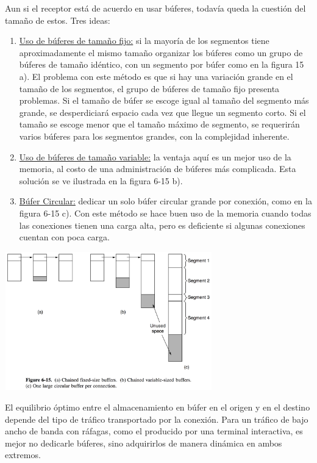 \documentclass[10pt,a4paper]{report}
\begin{document}
	\par Aun si el receptor está de acuerdo en usar búferes, todavía queda la cuestión del tamaño de estos. Tres ideas: 
	\begin{enumerate}
		\item \underline{Uso de búferes de tamaño fijo:} si la mayoría de los segmentos tiene aproximadamente el mismo tamaño organizar los búferes como un grupo de búferes de tamaño idéntico, con un segmento por búfer como en la figura 15 a). El problema con este método es que si hay una variación grande en el tamaño de los segmentos, el grupo de búferes de tamaño fijo presenta problemas. Si el tamaño de búfer se escoge igual al tamaño del segmento más grande, se desperdiciará espacio cada vez que llegue un segmento corto. Si el tamaño se escoge menor que el tamaño máximo de segmento, se requerirán varios búferes para los segmentos grandes, con la complejidad inherente.

		\item \underline{Uso de búferes de tamaño variable:} la ventaja aquí es un mejor uso de la memoria, al costo de una administración de búferes más complicada. Esta solución se ve ilustrada en la figura 6-15 b).

		\item \underline{Búfer Circular:}	dedicar un solo búfer circular grande por conexión, como en la figura 6-15 c). Con este método se hace buen uso de la memoria cuando todas las conexiones tienen una carga alta, pero es deficiente si algunas conexiones cuentan con poca carga.
	\end{enumerate}	 
	
	\begin{center}
		\includegraphics[width=9cm, height=6cm]{./imagenes/bufer.png} 
	\end{center}
	
	\par El equilibrio óptimo entre el almacenamiento en búfer en el origen y en el destino depende del tipo de tráfico transportado por la conexión. Para un tráfico de bajo ancho de banda con ráfagas, como el producido por una terminal interactiva, es mejor no dedicarle búferes, sino adquirirlos de manera dinámica en ambos extremos. 
	
\end{document}
